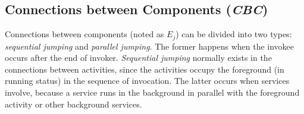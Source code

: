 

\subsection{Connections between Components (\textit{CBC})}
Connections between components (noted as $E_j$) can be divided into two types: \textit{sequential jumping} and \textit{parallel jumping}. The former happens when the invokee occurs after the end of invoker. \textit{Sequential jumping} normally exists in the connections between activities, since the activities occupy the foreground (in running status) in the sequence of invocation. The latter occurs when services involve, because a service runs in the background in parallel with the foreground activity or other background services. 

